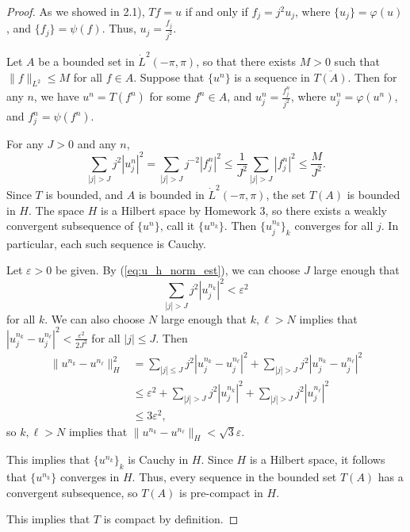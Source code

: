 \documentclass{homework}
\begin{document}
\begin{arabicparts}
\begin{proof}
			As we showed in 2.1), $Tf = u$ if and only if $f_j = j^2u_j$, where $\{u_j\} = \varphi(u)$, and $\{f_j\} = \psi(f)$. Thus, $u_j = \frac{f_j}{j^2}$.
			
			Let $A$ be a bounded set in $\dot{L}^2(-\pi,\pi)$, so that there exists $M > 0$ such that $\lVert f \rVert_{L^2} \le M$ for all $f \in A$. Suppose that $\{u^n\}$ is a sequence in $\overline{T(A)}$. Then for any $n$, we have $u^n = T(f^n)$ for some $f^n \in A$, and $u^n_j = \frac{f^n_j}{j^2}$, where $u^n_j = \varphi(u^n)$, and $f^n_j = \psi(f^n)$.
			
			For any $J > 0$ and any $n$,
			\begin{equation}
				\label{eq:u_h_norm_est}
				\sum_{|j| > J} j^2|u^n_j|^2 = \sum_{|j| > J} j^{-2}|f_j^n|^2 \le \frac{1}{J^2}\sum_{|j| > J}|f^n_j|^2 \le \frac{M}{J^2}.
			\end{equation}
			Since $T$ is bounded, and $A$ is bounded in $\dot{L}^2(-\pi,\pi)$, the set $T(A)$ is bounded in $H$. The space $H$ is a Hilbert space by Homework 3, so there exists a weakly convergent subsequence of $\{u^n\}$, call it $\{u^{n_k}\}$. Then $\{u^{n_k}_j\}_k$ converges for all $j$. In particular, each such sequence is Cauchy.
			
			Let $\varepsilon > 0$ be given. By (\ref{eq:u_h_norm_est}), we can choose $J$ large enough that
			\begin{equation}
				\sum_{|j| > J} j^2|u^{n_k}_j|^2 < \varepsilon^2
			\end{equation}
			for all $k$. We can also choose $N$ large enough that $k,\ell>N$ implies that $|u^{n_k}_j - u^{n_\ell}_j|^2 < \frac{\varepsilon^2}{2J^3}$ for all $|j| \le J$. Then
			\begin{align}
				\lVert u^{n_k} - u^{n_\ell}\rVert_H^2 &= \sum_{|j|\le J}j^2|u^{n_k}_j - u^{n_\ell}_j|^2 + \sum_{|j| > J}j^2|u^{n_k}_j - u^{n_\ell}_j|^2 \\
				&\le \varepsilon^2 + \sum_{|j|>J}j^2|u^{n_k}_j|^2 + \sum_{|j|>J}j^2|u^{n_\ell}_j|^2\\
				&\le 3\varepsilon^2,
			\end{align}
			so $k,\ell > N$ implies that $\lVert u^{n_k} - u^{n_\ell}\rVert_H < \sqrt{3}\varepsilon$.
			
			This implies that $\{u^{n_k}\}_k$ is Cauchy in $H$. Since $H$ is a Hilbert space, it follows that $\{u^{n_k}\}$ converges in $H$. Thus, every sequence in the bounded set $T(A)$ has a convergent subsequence, so $T(A)$ is pre-compact in $H$.
			
			This implies that $T$ is compact by definition.
		\end{proof}
		

\end{arabicparts}
\end{document}
